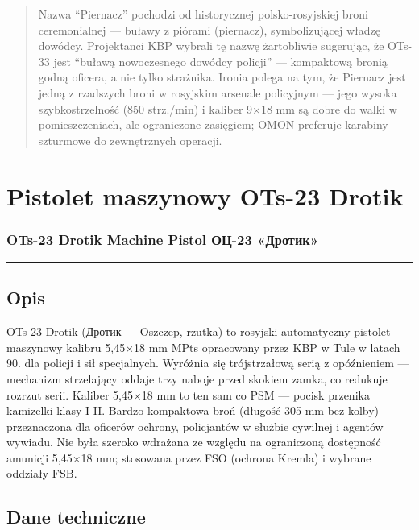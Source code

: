 \documentclass[12pt,openany,oneside]{book}
\begin{document}
\begin{quote}
Nazwa ``Piernacz'' pochodzi od historycznej polsko-rosyjskiej broni
ceremonialnej --- buławy z piórami (piernacz), symbolizującej władzę
dowódcy. Projektanci KBP wybrali tę nazwę żartobliwie sugerując, że
OTs-33 jest ``buławą nowoczesnego dowódcy policji'' --- kompaktową
bronią godną oficera, a nie tylko strażnika. Ironia polega na tym, że
Piernacz jest jedną z rzadszych broni w rosyjskim arsenale policyjnym
--- jego wysoka szybkostrzelność (850 strz./min) i kaliber 9×18 mm są
dobre do walki w pomieszczeniach, ale ograniczone zasięgiem; OMON
preferuje karabiny szturmowe do zewnętrznych operacji.
\end{quote}

\chapter{Pistolet maszynowy OTs-23
Drotik}\label{pistolet-maszynowy-ots-23-drotik}

\subsection{OTs-23 Drotik Machine Pistol \textbar{} ОЦ-23
«Дротик»}\label{ots-23-drotik-machine-pistol-ux43eux446-23-ux434ux440ux43eux442ux438ux43a}

\begin{center}\rule{0.5\linewidth}{0.5pt}\end{center}

\section{Opis}\label{opis-95}

OTs-23 Drotik (Дротик --- Oszczep, rzutka) to rosyjski automatyczny
pistolet maszynowy kalibru 5,45×18 mm MPts opracowany przez KBP w Tule w
latach 90. dla policji i sił specjalnych. Wyróżnia się trójstrzałową
serią z opóźnieniem --- mechanizm strzelający oddaje trzy naboje przed
skokiem zamka, co redukuje rozrzut serii. Kaliber 5,45×18 mm to ten sam
co PSM --- pocisk przenika kamizelki klasy I-II. Bardzo kompaktowa broń
(długość 305 mm bez kolby) przeznaczona dla oficerów ochrony,
policjantów w służbie cywilnej i agentów wywiadu. Nie była szeroko
wdrażana ze względu na ograniczoną dostępność amunicji 5,45×18 mm;
stosowana przez FSO (ochrona Kremla) i wybrane oddziały FSB.

\section{Dane techniczne}\label{dane-techniczne-95}
\end{document}
